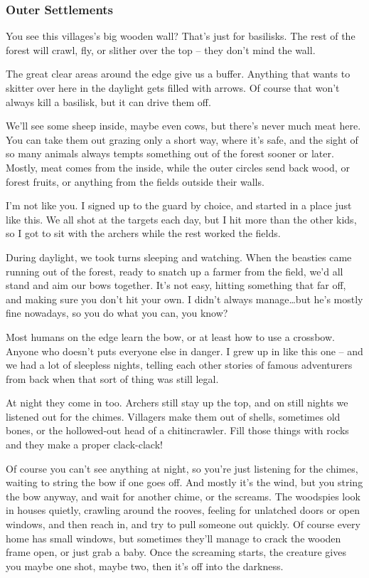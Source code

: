 \begin{multicols}{2}
\begin{exampletext}
  \subsubsection*{Outer Settlements}

  You see this \glspl{village}'s big wooden wall?
  That's just for basilisks.
  The rest of the forest will crawl, fly, or slither over the top -- they don't mind the wall.

  The great clear areas around the \gls{edge} give us a buffer.
  Anything that wants to skitter over here in the daylight gets filled with arrows.
  Of course that won't always kill a basilisk, but it can drive them off.

  We'll see some sheep inside, maybe even cows, but there's never much meat here.
  You can take them out grazing only a short way, where it's safe, and the sight of so many animals always tempts something out of the forest sooner or later.
  Mostly, meat comes from the inside, while the outer circles send back wood, or forest fruits, or anything from the fields outside their walls.

  I'm not like you.
  I signed up to the \gls{guard} by choice, and started in a place just like this.
  We all shot at the targets each day, but I hit more than the other kids, so I got to sit with the archers while the rest worked the fields.

  During daylight, we took turns sleeping and watching.
  When the beasties came running out of the forest, ready to snatch up a farmer from the field, we'd all stand and aim our bows together.
  It's not easy, hitting something that far off, and making sure you don't hit your own.
  I didn't always manage\ldots but he's mostly fine nowadays, so you do what you can, you know?

  Most humans on the \gls{edge} learn the bow, or at least how to use a crossbow.
  Anyone who doesn't puts everyone else in danger.
  I grew up in  like this one -- and we had a lot of sleepless nights, telling each other stories of famous adventurers from back when that sort of thing was still legal.

  At night they come in too.
  Archers still stay up the top, and on still nights we listened out for the chimes.
  Villagers make them out of shells, sometimes old bones, or the hollowed-out head of a chitincrawler.
  Fill those things with rocks and they make a proper clack-clack!

  Of course you can't see anything at night, so you're just listening for the chimes, waiting to string the bow if one goes off.
  And mostly it's the wind, but you string the bow anyway, and wait for another chime, or the screams.
  The woodspies look in houses quietly, crawling around the rooves, feeling for unlatched doors or open windows, and then reach in, and try to pull someone out quickly.
  Of course every home has small windows, but sometimes they'll manage to crack the wooden frame open, or just grab a baby.
  Once the screaming starts, the creature gives you maybe one shot, maybe two, then it's off into the darkness.


\end{exampletext}
\end{multicols}
